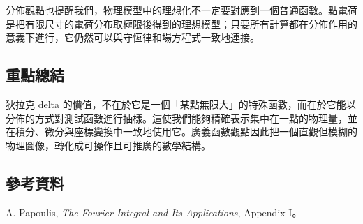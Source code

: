 \documentclass[10pt,a4paper,fontset=none]{ctexart}
\begin{document}
分佈觀點也提醒我們，物理模型中的理想化不一定要對應到一個普通函數。點電荷是把有限尺寸的電荷分布取極限後得到的理想模型；只要所有計算都在分佈作用的意義下進行，它仍然可以與守恆律和場方程式一致地連接。

\subsection{重點總結}
狄拉克 delta 的價值，不在於它是一個「某點無限大」的特殊函數，而在於它能以分佈的方式對測試函數進行抽樣。這使我們能夠精確表示集中在一點的物理量，並在積分、微分與座標變換中一致地使用它。廣義函數觀點因此把一個直觀但模糊的物理圖像，轉化成可操作且可推廣的數學結構。

\subsection*{參考資料}
A. Papoulis, \textit{The Fourier Integral and Its Applications}, Appendix I。
\end{document}
